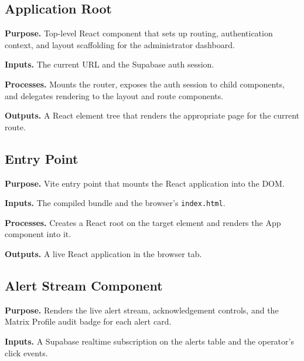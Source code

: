 \subsection{Application Root}
\label{sec:code_frontend_app}

\noindent\textbf{Purpose.} Top-level React component that sets up routing, authentication context, and layout scaffolding for the administrator dashboard.

\noindent\textbf{Inputs.} The current URL and the Supabase auth session.

\noindent\textbf{Processes.} Mounts the router, exposes the auth session to child components, and delegates rendering to the layout and route components.

\noindent\textbf{Outputs.} A React element tree that renders the appropriate page for the current route.



\subsection{Entry Point}
\label{sec:code_frontend_main}

\noindent\textbf{Purpose.} Vite entry point that mounts the React application into the DOM.

\noindent\textbf{Inputs.} The compiled bundle and the browser's \texttt{index.html}.

\noindent\textbf{Processes.} Creates a React root on the target element and renders the App component into it.

\noindent\textbf{Outputs.} A live React application in the browser tab.



\subsection{Alert Stream Component}
\label{sec:code_frontend_alerts}

\noindent\textbf{Purpose.} Renders the live alert stream, acknowledgement controls, and the Matrix Profile audit badge for each alert card.

\noindent\textbf{Inputs.} A Supabase realtime subscription on the alerts table and the operator's click events.

